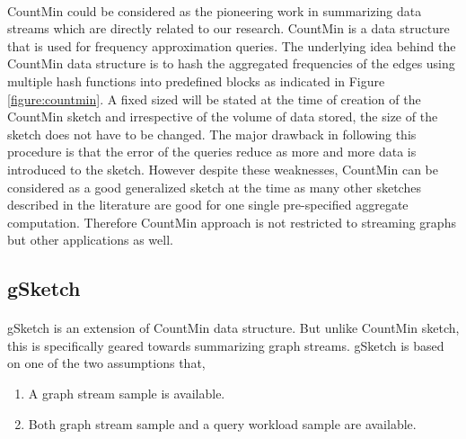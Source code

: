 \paragraph{}
CountMin\cite{cormode_improved_2003} could be considered as the pioneering work in summarizing data streams which are directly related to our research. CountMin\cite{cormode_improved_2003} is a data structure that is used for frequency approximation queries. The underlying idea behind the CountMin\cite{cormode_improved_2003} data structure is to hash the aggregated frequencies of the edges using multiple hash functions into predefined blocks as indicated in Figure \ref{figure:countmin}. A fixed sized will be stated at the time of creation of the CountMin\cite{cormode_improved_2003} sketch and irrespective of the volume of data stored, the size of the sketch does not have to be changed. The major drawback in following this procedure is that the error of the queries reduce as more and more data is introduced to the sketch. However despite these weaknesses, CountMin\cite{cormode_improved_2003} can be considered as a good generalized sketch at the time as many other sketches described in the literature are good for one single pre-specified aggregate computation. Therefore CountMin\cite{cormode_improved_2003} approach is not restricted to streaming graphs but other applications as well\cite{cormode_improved_2003}. 

\subsection{gSketch}

\paragraph{}
gSketch\cite{zhao_gsketch:_2011} is an extension of CountMin\cite{cormode_improved_2003} data structure. But unlike CountMin\cite{cormode_improved_2003} sketch, this is specifically geared towards summarizing graph streams. gSketch\cite{zhao_gsketch:_2011} is based on one of the two assumptions that,

\begin{enumerate}
    \item A graph stream sample is available.
    \item Both graph stream sample and a query workload sample are available.
\end{enumerate}

